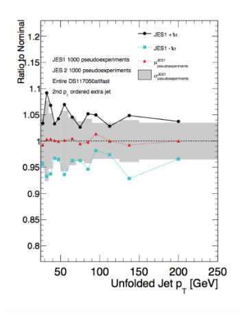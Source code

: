 \begin{figure}
\begin{subfigure}[]{0.45\textwidth}
\includegraphics[width=\textwidth]{fig/UnfoldSys/JESJet1.pdf}
\end{subfigure} \\
\begin{subfigure}[]{0.45\textwidth}

\end{subfigure}
\end{figure}
